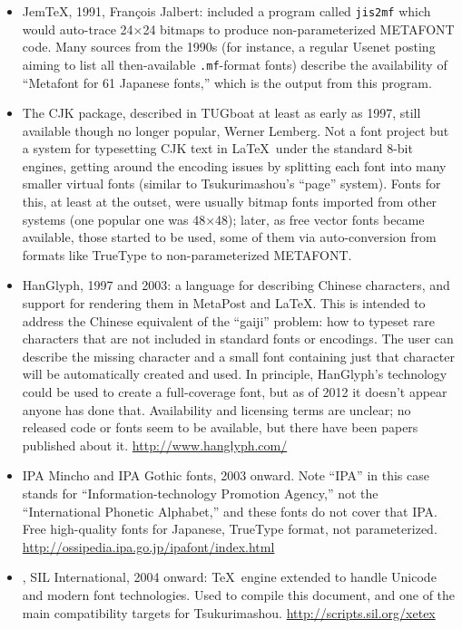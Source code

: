 \documentclass[14pt]{extarticle}
\begin{document}
\begin{itemize}
\item Jem\TeX, 1991, François Jalbert: included a program called
\texttt{jis2mf} which would auto-trace 24×24 bitmaps to produce
non-parameterized METAFONT code.  Many sources from the 1990s
(for instance, a regular Usenet posting
aiming to list all then-available \texttt{.mf}-format fonts) describe
the availability of ``Metafont for 61 Japanese fonts,'' which is the output
from this program.

\item The CJK package, described in TUGboat at least as early as 1997, still
available though no longer popular, Werner Lemberg.  Not a font project but
a system for typesetting CJK text in \LaTeX\ under the standard 8-bit
engines, getting around the encoding issues by splitting each font into many
smaller virtual fonts (similar to Tsukurimashou's ``page'' system).  Fonts
for this, at least at the outset, were usually bitmap fonts imported from
other systems (one popular one was 48×48); later, as free vector fonts
became available, those started to be used, some of them via auto-conversion
from formats like TrueType to non-parameterized METAFONT.

\item HanGlyph, 1997 and 2003: a language for describing Chinese
characters, and support for rendering them in MetaPost and \LaTeX.
This is intended to address the Chinese equivalent of the ``gaiji''
problem: how to typeset rare characters that are not included in
standard fonts or encodings.  The user can describe the missing
character and a small font containing just that character will be
automatically created and used.  In principle, HanGlyph's technology
could be used to create a full-coverage font, but as of 2012 it
doesn't appear anyone has done that.  Availability and licensing terms
are unclear; no released code or fonts seem to be available, but there
have been papers published about it. \url{http://www.hanglyph.com/}

\item IPA Mincho and IPA Gothic fonts, 2003 onward.  Note ``IPA'' in this
case stands for ``Information-technology Promotion Agency,'' not the
``International Phonetic Alphabet,'' and these fonts do not cover that IPA.
Free high-quality fonts for Japanese, TrueType format, not parameterized. 
\url{http://ossipedia.ipa.go.jp/ipafont/index.html}

\item \XeTeX, SIL International, 2004 onward: \TeX\ engine extended to
handle Unicode and modern font technologies.  Used to compile this document,
and one of the main compatibility targets for Tsukurimashou.
\url{http://scripts.sil.org/xetex}


\end{itemize}
\end{document}

